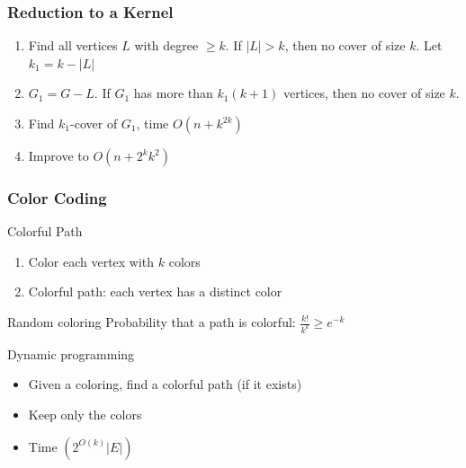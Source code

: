 \documentclass[12pt,aspectratio=169]{beamer}
\begin{document}
\begin{frame}\frametitle{Reduction to a Kernel}
  \begin{enumerate}
  \item
    Find all vertices $L$ with degree $\ge k$.
%
    If $|L|>k$, then no cover of size $k$.
%
    Let $k_{1} = k - |L|$
  \item
    $G_{1} = G - L$.
%
    If $G_{1}$ has more than $k_{1}(k+1)$ vertices, then no cover of size $k$.
  \item
    Find  $k_{1}$-cover of $G_{1}$, time $O(n + k^{2k})$
  \item
    Improve to $O(n + 2^{k}k^{2})$
  \end{enumerate}
\end{frame}


\begin{frame}\frametitle{Color Coding }
  \begin{block}{Colorful Path}
    \begin{enumerate}
    \item
      Color each vertex with $k$ colors
    \item
      Colorful path: each vertex has a distinct color
    \end{enumerate}
  \end{block}

  \begin{block}{Random coloring}
    Probability that a path is colorful: $\frac{k!}{k^{k}} \ge e^{-k}$
  \end{block}

  \begin{block}{Dynamic programming}
    \begin{itemize}
      \item
        Given a coloring, find a colorful path (if it exists)
      \item
        Keep only the colors
      \item
        Time $(2^{O(k)}|E|)$
      \end{itemize}
    \end{block}
\end{frame} 
\end{document}
